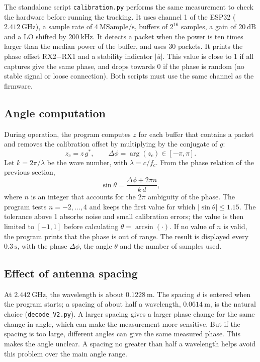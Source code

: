 The standalone script \texttt{calibration.py} performs the same measurement
to check the hardware before running the tracking. It uses channel 1 of the
ESP32 (\(2.412~\mathrm{GHz}\)), a sample rate of \(4~\mathrm{MSample/s}\),
buffers of \(2^{16}\) samples, a gain of \(20~\mathrm{dB}\) and a LO shifted by
\(200~\mathrm{kHz}\). It detects a packet when the power is ten times larger
than the median power of the buffer, and uses 30 packets. It prints the phase
offset RX2$-$RX1 and a stability indicator \(|\overline{u}|\). This value is
close to 1 if all captures give the same phase, and drops towards 0 if the
phase is random (no stable signal or loose connection). Both scripts must use
the same channel as the firmware.

\subsection{Angle computation}

During operation, the program computes \(z\) for each buffer that contains a
packet and removes the calibration offset by multiplying by the conjugate of
\(g\):
\[
    z_c = z\,g^{*},
    \qquad
    \Delta\phi = \arg(z_c) \in [-\pi,\pi].
\]
Let \(k = 2\pi/\lambda\) be the wave number, with \(\lambda = c/f_c\). From
the phase relation of the previous section,
\[
    \sin\theta = \frac{\Delta\phi + 2\pi n}{k\,d},
\]
where \(n\) is an integer that accounts for the \(2\pi\) ambiguity of the
phase. The program tests \(n = -2, \dots, 4\) and keeps the first value for
which \(|\sin\theta|\le 1.15\). The tolerance above 1 absorbs noise and
small calibration errors; the value is then limited to \([-1,1]\) before
calculating \(\theta = \arcsin(\cdot)\). If no value of \(n\) is valid, the
program prints that the phase is out of range. The result is displayed every
\(0.3~\mathrm{s}\), with the phase \(\Delta\phi\), the angle \(\theta\) and the
number of samples used.

\subsection{Effect of antenna spacing}

At \(2.442~\mathrm{GHz}\), the wavelength is about \(0.1228~\mathrm{m}\). The
spacing \(d\) is entered when the program starts; a spacing of about half a
wavelength, \(0.0614~\mathrm{m}\), is the natural choice
(\texttt{decode\_V2.py}). A larger spacing gives a larger phase
change for the same change in angle, which can make the measurement more
sensitive. But if the spacing is too large, different angles can give the
same measured phase. This makes the angle unclear. A spacing no greater than
half a wavelength helps avoid this problem over the main angle range.

